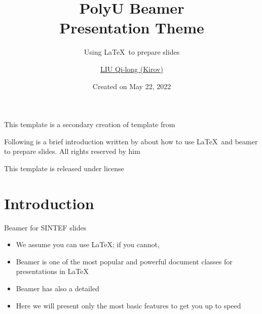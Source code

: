\documentclass{sintefbeamer}
\title{PolyU Beamer\\ Presentation Theme}
\subtitle{Using \LaTeX\ to prepare slides}
\author{\href{mailto:qilong-kirov.liu@connect.polyu.hk}{LIU Qi-long (Kirov)}}
\date{Created on May 22, 2022}
\begin{document}
\maketitle

\begin{frame}

This template is a secondary creation of  template from  \vspace{\baselineskip}

Following is a brief introduction written by  about how to use \LaTeX\ and beamer to prepare slides. All rights reserved by him\vspace{\baselineskip}

This template is released under  license

\end{frame}

\section{Introduction}

\begin{frame}{Beamer for SINTEF slides}{\thesection \, \secname}

\begin{itemize}
\item We assume you can use \LaTeX; if you cannot,
\item Beamer is one of the most popular and powerful document
classes for presentations in \LaTeX
\item Beamer has also a detailed
\item Here we will present only the most basic features to get you up to speed
\end{itemize}
\end{frame}
\end{document}
